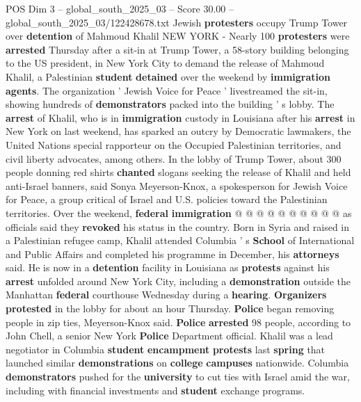 \begin{textsample}{POS Dim 3 – global\_south\_2025\_03 – Score 30.00 – global\_south\_2025\_03/122428678.txt}  \label{ex:f3_pos_037}
Jewish \textbf{protesters} occupy Trump Tower over \textbf{detention} of Mahmoud Khalil NEW YORK - Nearly 100 \textbf{protesters} were \textbf{arrested} Thursday after a sit-in at Trump Tower, a 58-story building belonging to the US president, in New York City to demand the release of Mahmoud Khalil, a Palestinian \textbf{student} \textbf{detained} over the weekend by \textbf{immigration} \textbf{agents}.
The organization ' Jewish Voice for Peace ' livestreamed the sit-in, showing hundreds of \textbf{demonstrators} packed into the building ' s lobby.
The \textbf{arrest} of Khalil, who is in \textbf{immigration} custody in Louisiana after his \textbf{arrest} in New York on last weekend, has sparked an outcry by Democratic lawmakers, the United Nations special rapporteur on the Occupied Palestinian territories, and civil liberty advocates, among others.
In the lobby of Trump Tower, about 300 people donning red shirts \textbf{chanted} slogans seeking the release of Khalil and held anti-Israel banners, said Sonya Meyerson-Knox, a spokesperson for Jewish Voice for Peace, a group critical of Israel and U.S. policies toward the Palestinian territories.
Over the weekend, \textbf{federal} \textbf{immigration} @ @ @ @ @ @ @ @ @ @ as officials said they \textbf{revoked} his status in the country.
Born in Syria and raised in a Palestinian refugee camp, Khalil attended Columbia ' s \textbf{School} of International and Public Affairs and completed his programme in December, his \textbf{attorneys} said.
He is now in a \textbf{detention} facility in Louisiana as \textbf{protests} against his \textbf{arrest} unfolded around New York City, including a \textbf{demonstration} outside the Manhattan \textbf{federal} courthouse Wednesday during a \textbf{hearing}. \textbf{Organizers} \textbf{protested} in the lobby for about an hour Thursday. \textbf{Police} began removing people in zip ties, Meyerson-Knox said. \textbf{Police} \textbf{arrested} 98 people, according to John Chell, a senior New York \textbf{Police} Department official.
Khalil was a lead negotiator in Columbia \textbf{student} \textbf{encampment} \textbf{protests} last \textbf{spring} that launched similar \textbf{demonstrations} on \textbf{college} \textbf{campuses} nationwide.
Columbia \textbf{demonstrators} pushed for the \textbf{university} to cut ties with Israel amid the war, including with financial investments and \textbf{student} exchange programs.

\end{textsample}
